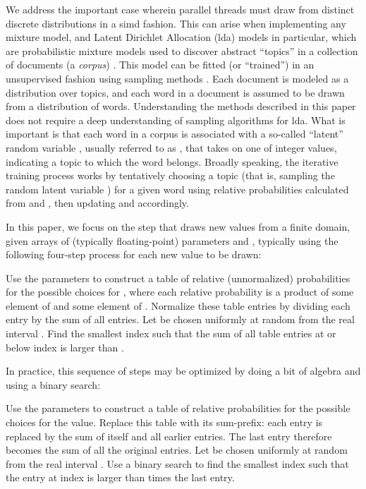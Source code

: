 \documentclass[10pt,nohyperref]{sigplanconf}
\begin{document}
We address the important case wherein parallel threads must
draw from distinct discrete distributions in a {\sc simd} fashion.
This can arise when implementing any mixture model, and Latent Dirichlet Allocation ({\sc lda}) models in particular,
which are probabilistic mixture models used to discover abstract ``topics'' in a collection of documents (a \emph{corpus}) \cite{blei_latent_2003}. This model can be fitted (or ``trained'') in an unsupervised fashion using sampling methods \cite[chapter 11]{Bishop}\cite{griffiths_finding_2004}. Each document is modeled as a distribution  over topics, and each word in a document is assumed to be drawn from a distribution  of words. Understanding the methods described in this paper does not require a deep understanding of sampling algorithms for {\sc lda}. What is important is that each word in a corpus is associated with a so-called ``latent'' random variable \cite[chapter 9]{Bishop}, usually referred to as , that takes on one of  integer values, indicating a topic to which the word belongs.  Broadly speaking, the iterative training process works by tentatively choosing a topic (that is, sampling the random latent variable ) for a given word using relative probabilities calculated from  and , then updating  and  accordingly.

In this paper, we focus on the step that draws new  values from a finite domain,
given arrays of (typically floating-point) parameters  and ,
typically using the following four-step process for each new  value to be drawn:
\par{}Use the parameters to construct a table of relative (unnormalized) probabilities for the possible choices for ,
where each relative probability is a product of some element of  and some element of .
\hfill{}Normalize these table entries by dividing each entry by the sum of all entries.
\hfill{}Let  be chosen uniformly at random from the real interval .
\hfill{}Find the smallest index  such that the sum of all table entries at or below index  is larger than .
\par\noindent In practice, this sequence of steps may be optimized
by doing a bit of algebra and using a binary search:
\par{}Use the parameters to construct a table of relative probabilities for the possible choices for the  value.
\hfill{}Replace this table with its sum-prefix: each entry is replaced by the sum of itself and all earlier entries.  The last entry therefore becomes the sum of all the original entries.
\hfill{}Let  be chosen uniformly at random from the real interval .
\hfill{}Use a binary search to find the smallest index  such that the entry at index  is larger than  times the last entry.
\end{document}
